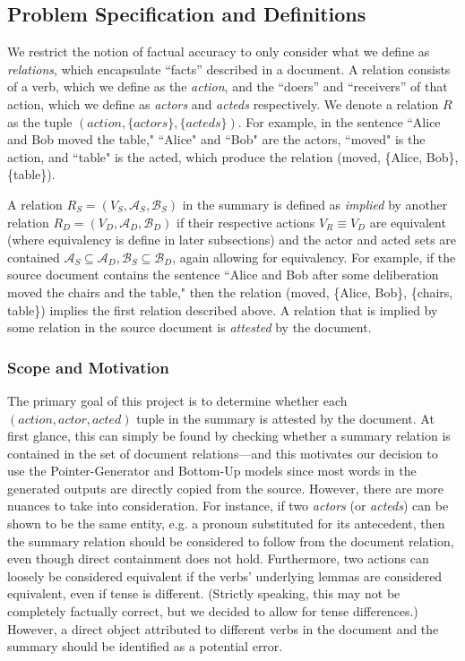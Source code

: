 \documentclass{article}
\begin{document}
\subsection{Problem Specification and Definitions}

We restrict the notion of factual accuracy to only consider what we define as \textit{relations}, which encapsulate ``facts'' described in a document. A relation consists of a verb, which we define as the \textit{action}, and the ``doers'' and ``receivers'' of that action, which we define as \textit{actors} and \textit{acteds} respectively.  We denote a relation $R$ as the tuple $(action,\{actors\},\{acteds\})$. For example, in the sentence ``Alice and Bob moved the table," ``Alice" and ``Bob" are the actors, ``moved" is the action, and ``table" is the acted, which produce the relation (moved, \{Alice, Bob\}, \{table\}).

A relation $R_S = (V_S,\mathcal{A}_S,\mathcal{B}_S)$ in the summary is defined as \textit{implied} by another relation $R_D = (V_D,\mathcal{A}_D,\mathcal{B}_D)$ if their respective actions $V_R \equiv V_D$ are equivalent (where equivalency is define in later subsections) and the actor and acted sets are contained $\mathcal{A}_S \subseteq \mathcal{A}_D, \mathcal{B}_S \subseteq \mathcal{B}_D$, again allowing for equivalency. For example, if the source document contains the sentence ``Alice and Bob after some deliberation moved the chairs and the table," then the relation (moved, \{Alice, Bob\}, \{chairs, table\}) implies the first relation described above. A relation that is implied by some relation in the source document is \textit{attested} by the document.

\subsubsection{Scope and Motivation}

The primary goal of this project is to determine whether each $(action, actor, acted)$ tuple in the summary is attested by the document. At first glance, this can simply be found by checking whether a summary relation is contained in the set of document relations---and this motivates our decision to use the Pointer-Generator and Bottom-Up models since most words in the generated outputs are directly copied from the source. However, there are more nuances to take into consideration. For instance, if two \textit{actors} (or \textit{acteds}) can be shown to be the same entity, e.g. a pronoun substituted for its antecedent, then the summary relation should be considered to follow from the document relation, even though direct containment does not hold. Furthermore, two actions can loosely be considered equivalent if the verbs' underlying lemmas are considered equivalent, even if tense is different. (Strictly speaking, this may not be completely factually correct, but we decided to allow for tense differences.) However, a direct object attributed to different verbs in the document and the summary should be identified as a potential error.
\end{document}
